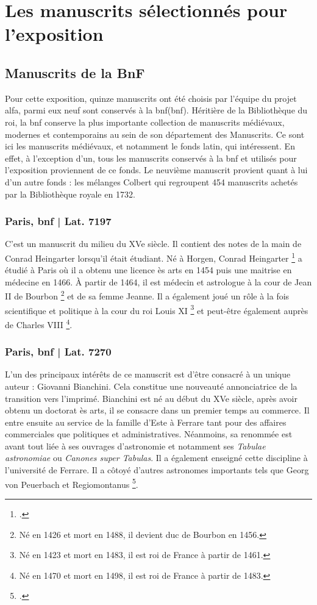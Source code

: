 	\section{Les manuscrits sélectionnés pour l’exposition}
	\subsection{Manuscrits de la BnF}
	Pour cette exposition, quinze manuscrits ont été choisis par l’équipe du projet \acrshort{alfa}, parmi eux neuf sont conservés à la \acrlong{bnf}(\acrshort{bnf}). Héritière de la Bibliothèque du roi, la \acrshort{bnf} conserve la plus importante collection de manuscrits médiévaux, modernes et contemporains au sein de son département des Manuscrits. Ce sont ici les manuscrits médiévaux, et notamment le fonds latin, qui intéressent. En effet, à l’exception d’un, tous les manuscrits conservés à la \acrshort{bnf} et utilisés pour l’exposition proviennent de ce fonds. Le neuvième manuscrit provient quant à lui d’un autre fonds : les mélanges Colbert qui regroupent 454 manuscrits achetés par la Bibliothèque royale en 1732. 
	
	\subsubsection{Paris, \acrshort{bnf} | Lat. 7197}
    C’est un manuscrit du milieu du XVe siècle. Il contient des notes de la main de Conrad Heingarter lorsqu’il était étudiant. Né à Horgen, Conrad Heingarter \footnote{\cite{hussonArtAstrologicalComputations2021}.} a étudié à Paris où il a obtenu une licence ès arts en 1454 puis une maitrise en médecine en 1466. À partir de 1464, il est médecin et astrologue à la cour de Jean II de Bourbon \footnote{Né en 1426 et mort en 1488, il devient duc de Bourbon en 1456.} et de sa femme Jeanne. Il a également joué un rôle à la fois scientifique et politique à la cour du roi Louis XI \footnote{Né en 1423 et mort en 1483, il est roi de France à partir de 1461.} et peut-être également auprès de Charles VIII \footnote{Né en 1470 et mort en 1498, il est roi de France à partir de 1483.}.

    \subsubsection{Paris, \acrshort{bnf} | Lat. 7270}
    L’un des principaux intérêts de ce manuscrit est d’être consacré à un unique auteur : Giovanni Bianchini. Cela constitue une nouveauté annonciatrice de la transition vers l’imprimé. Bianchini est né au début du XVe siècle, après avoir obtenu un doctorat ès arts, il se consacre dans un premier temps au commerce. Il entre ensuite au service de la famille d’Este à Ferrare tant pour des affaires commerciales que politiques et administratives. Néanmoins, sa renommée est avant tout liée à ses ouvrages d’astronomie et notamment ses \textit{Tabulae astronomiae} ou \textit{Canones super Tabulas}. Il a également enseigné cette discipline à l’université de Ferrare. Il a côtoyé d’autres astronomes importants tels que Georg von Peuerbach et Regiomontanus \footnote{\cite{federicivescoviniGiovanniBianchini1968}.}. 

